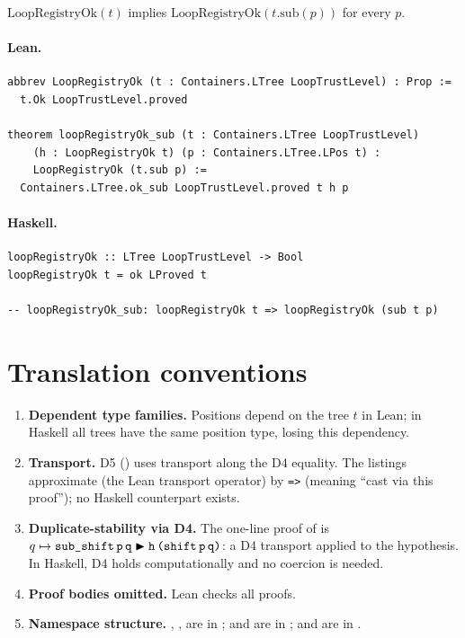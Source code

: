 \documentclass[11pt,a4paper]{article}
\begin{document}
\begin{thm}
$\mathrm{LoopRegistryOk}(t)$ implies $\mathrm{LoopRegistryOk}(t.\mathrm{sub}(p))$
for every $p$.
\end{thm}

\paragraph{Lean.}
\begin{lstlisting}[style=lean]
abbrev LoopRegistryOk (t : Containers.LTree LoopTrustLevel) : Prop :=
  t.Ok LoopTrustLevel.proved

theorem loopRegistryOk_sub (t : Containers.LTree LoopTrustLevel)
    (h : LoopRegistryOk t) (p : Containers.LTree.LPos t) :
    LoopRegistryOk (t.sub p) :=
  Containers.LTree.ok_sub LoopTrustLevel.proved t h p
\end{lstlisting}

\paragraph{Haskell.}
\begin{lstlisting}[style=haskell]
loopRegistryOk :: LTree LoopTrustLevel -> Bool
loopRegistryOk t = ok LProved t

-- loopRegistryOk_sub: loopRegistryOk t => loopRegistryOk (sub t p)
\end{lstlisting}

\section{Translation conventions}

\begin{enumerate}
\item \textbf{Dependent type families.}  Positions  depend on
  the tree $t$ in Lean; in Haskell all trees have the same position type,
  losing this dependency.

\item \textbf{Transport.}  D5 () uses transport along the
  D4 equality.  The listings approximate \lean{|>} (the Lean transport operator) by \texttt{=>} (meaning
  ``cast via this proof''); no Haskell counterpart exists.

\item \textbf{Duplicate-stability via D4.}  The one-line proof of
   is $q \mapsto \texttt{sub\_shift\,p\,q} \blacktriangleright
  \texttt{h\,(shift\,p\,q)}$: a D4 transport applied to the hypothesis.
  In Haskell, D4 holds computationally and no coercion is needed.

\item \textbf{Proof bodies omitted.}  Lean checks all proofs.

\item \textbf{Namespace structure.}  , ,
   are in ;  and
   are in ;
   and  are in
  .
\end{enumerate}
\end{document}
